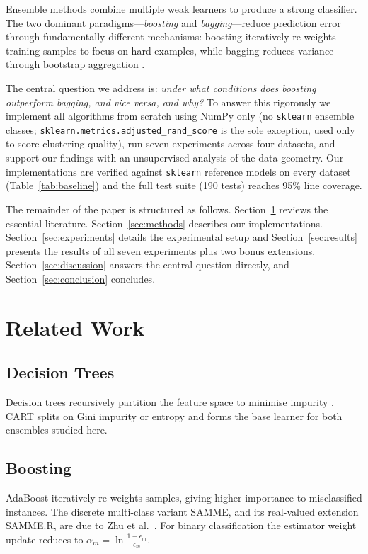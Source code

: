 \documentclass[conference]{IEEEtran}
\begin{document}
Ensemble methods combine multiple weak learners to produce a strong classifier.
The two dominant paradigms---\emph{boosting} and \emph{bagging}---reduce prediction
error through fundamentally different mechanisms: boosting iteratively re-weights
training samples to focus on hard examples, while bagging reduces variance through
bootstrap aggregation \cite{breiman1996bagging}.

The central question we address is: \emph{under what conditions does boosting
outperform bagging, and vice versa, and why?} To answer this rigorously we
implement all algorithms from scratch using NumPy only (no \texttt{sklearn} ensemble
classes; \texttt{sklearn.metrics.adjusted\_rand\_score} is the sole exception, used
only to score clustering quality), run seven experiments across four datasets, and
support our findings with an unsupervised analysis of the data geometry. Our
implementations are verified against \texttt{sklearn} reference models on every
dataset (Table~\ref{tab:baseline}) and the full test suite (190 tests) reaches 95\%
line coverage.

The remainder of the paper is structured as follows. Section~\ref{sec:related}
reviews the essential literature. Section~\ref{sec:methods} describes our
implementations. Section~\ref{sec:experiments} details the experimental setup and
Section~\ref{sec:results} presents the results of all seven experiments plus two
bonus extensions. Section~\ref{sec:discussion} answers the central question directly,
and Section~\ref{sec:conclusion} concludes.

\section{Related Work}
\label{sec:related}

\subsection{Decision Trees}
Decision trees recursively partition the feature space to minimise
impurity \cite{hastie2009elements}. CART \cite{breiman1984cart} splits on
Gini impurity or entropy and forms the base learner for both ensembles studied
here.

\subsection{Boosting}
AdaBoost \cite{freund1997decision} iteratively re-weights samples, giving higher
importance to misclassified instances. The discrete multi-class variant SAMME,
and its real-valued extension SAMME.R, are due to Zhu et al.\ \cite{zhu2009multiclass}.
For binary classification the estimator weight update reduces to
$\alpha_m = \ln\frac{1-\epsilon_m}{\epsilon_m}$.
\end{document}
